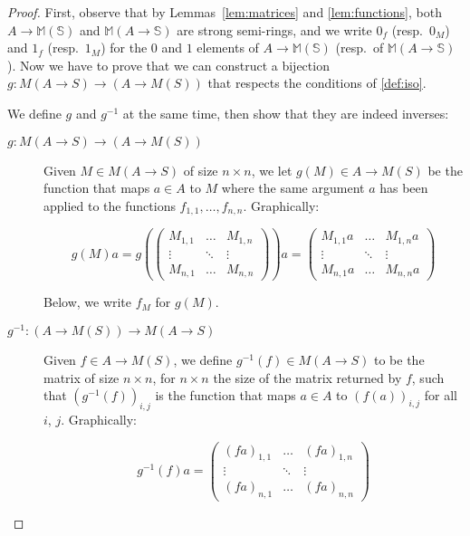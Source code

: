 \documentclass[runningheads]{llncs}
\begin{document}
\begin{proof}
	First, observe that by Lemmas~\ref{lem:matrices} and \ref{lem:functions}, both \(A \to \mathbb{M} (\mathbb{S} )\) and \(\mathbb{M} (A \to \mathbb{S} )\) are strong semi-rings, and we write \(0_f\) (resp.\ \(0_M\)) and \(1_f\) (resp.\ \(1_M\)) for the \(0\) and \(1\) elements of \(A \to \mathbb{M} (\mathbb{S} )\) (resp.\ of \(\mathbb{M} (A \to \mathbb{S} )\)).
	Now we have to prove that we can construct a bijection \(g : M(A \to S) \to (A \to M(S))\) that respects the conditions of \autoref{def:iso}.

	We define \(g\) and \(g^{-1}\) at the same time, then show that they are indeed inverses:
	\begin{description}
		\item[\(g : M(A \to S) \to (A \to M(S))\)]
			Given \(M \in M(A \to S)\) of size \(n \times n\), we let \(g(M) \in A \to M(S)\) be the function that maps \(a \in A\) to \(M\) where the same argument \(a\) has been applied to the functions \(f_{1,1}, \hdots, f_{n,n}\).
			Graphically:

			\[
				g(M)a =
				g(\begin{pmatrix}
					M_{1,1} & \ldots & M_{1,n} \\
					\vdots  & \ddots & \vdots  \\
					M_{n,1} & \ldots & M_{n,n}
				\end{pmatrix})a =
				\begin{pmatrix}
					M_{1,1}a & \ldots & M_{1,n}a \\
					\vdots   & \ddots & \vdots   \\
					M_{n,1}a & \ldots & M_{n,n}a
				\end{pmatrix}
			\]

			Below, we write \(f_M\) for \(g(M)\).

		\item[\(g^{-1}: (A \to M(S)) \to M(A \to S)\)]
			Given \(f \in A \to M(S)\), we define \(g^{-1}(f) \in M(A \to S)\) to be the matrix of size \(n \times n\), for \(n \times n\) the size of the matrix returned by \(f\), such that \((g^{-1}(f))_{i, j}\) is the function that maps \(a \in A\) to \((f(a))_{i,j}\) for all \(i\), \(j\).
			Graphically:

			\[
				g^{-1}(f)a =
				\begin{pmatrix}
					(fa)_{1,1} & \ldots & (fa)_{1,n} \\
					\vdots     & \ddots & \vdots     \\
					(fa)_{n,1} & \ldots & (fa)_{n,n}
				\end{pmatrix}
			\]


\end{description}
\end{proof}
\end{document}
